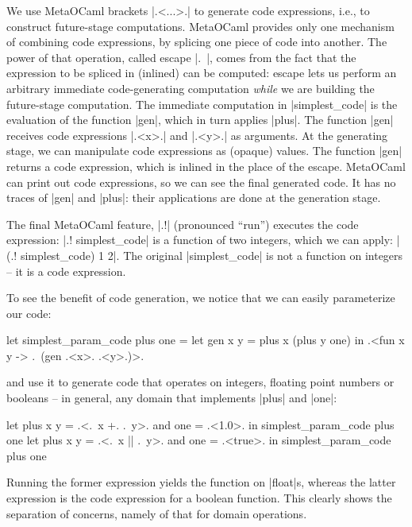\documentclass[draft]{elsart}
\begin{document}
We use MetaOCaml brackets |.<...>.| to generate code expressions,
i.e., to construct future-stage computations. MetaOCaml provides only
one mechanism of combining code expressions, by splicing one
piece of code into
another. The power of that operation, called escape |.~|, comes from
the fact that the expression to be spliced in (inlined) can be
computed: escape lets us perform an arbitrary immediate code-generating
computation \emph{while} we are
building the future-stage computation. The immediate computation in
|simplest_code| is the evaluation of the function |gen|, which in turn
applies |plus|. The function |gen| receives code expressions |.<x>.|
and |.<y>.| as arguments. At the generating stage, we can manipulate
code expressions as (opaque) values. The function |gen| returns a code
expression, which is inlined in the place of the escape. MetaOCaml can
print out code expressions, so we can see the final generated code. It
has no traces of |gen| and |plus|: their applications are done at the
generation stage.

The final MetaOCaml feature, |.!| (pronounced ``run'') 
executes the code expression: |.! simplest_code| is a function of two
integers, which we can apply: |(.! simplest_code) 1 2|. The original
|simplest_code| is not a function on integers -- it is a code
expression.

To see the benefit of code generation, we notice that we can easily
parameterize our code:

\begin{code}
let simplest_param_code plus one =
  let gen x y = plus x (plus y one) in
  .<fun x y -> .~(gen .<x>. .<y>.)>.
\end{code}
and use it to generate code that operates on integers, floating point
numbers or booleans -- in general, any domain that implements |plus|
and |one|:
\begin{code}
let plus x y = .<.~x +. .~y>. and one = .<1.0>. in
  simplest_param_code plus one
let plus x y = .<.~x || .~y>. and one = .<true>. in
  simplest_param_code plus one
\end{code}
Running the former expression yields the function on |float|s, whereas
the latter expression is the code expression for a boolean function.
This clearly shows the separation of concerns, namely of that for domain
operations.
\end{document}
